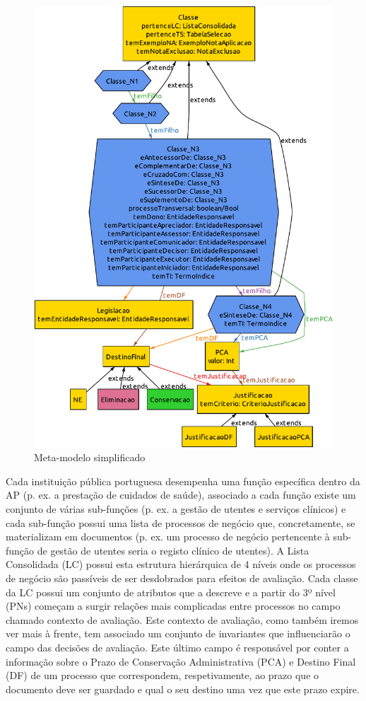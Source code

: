 \documentclass[tikz,runningheads,a4paper]{llncs}
\begin{document}
\begin{figure}[H]
\centering
\includegraphics[width=0.6\linewidth]{metamodel2.pdf}
\caption{Meta-modelo simplificado}
\label{metamodel}
\end{figure}

Cada instituição pública portuguesa desempenha uma função específica dentro da AP (p. ex. a prestação de cuidados de saúde), associado a cada função existe um conjunto de várias sub-funções (p. ex. a gestão de utentes e serviços clínicos) e cada sub-função possui uma lista de processos de negócio que, concretamente, se materializam em documentos (p. ex. um processo de negócio pertencente à sub-função de gestão de utentes seria o registo clínico de utentes). A Lista Consolidada (LC) possui esta estrutura hierárquica de 4 níveis\cite{clav-mod} onde os processos de negócio são passíveis de ser desdobrados para efeitos de avaliação. Cada classe da LC possui um conjunto de atributos que a descreve e a partir do 3º nível (PNs) começam a surgir relações mais complicadas entre processos no campo chamado contexto de avaliação. Este contexto de avaliação, como também iremos ver mais à frente, tem associado um conjunto de invariantes que influenciarão o campo das decisões de avaliação. Este último campo é responsável por conter a informação sobre o Prazo de Conservação Administrativa (PCA) e Destino Final (DF) de um processo que correspondem, respetivamente, ao prazo que o documento deve ser guardado e qual o seu destino uma vez que este prazo expire.
\end{document}
